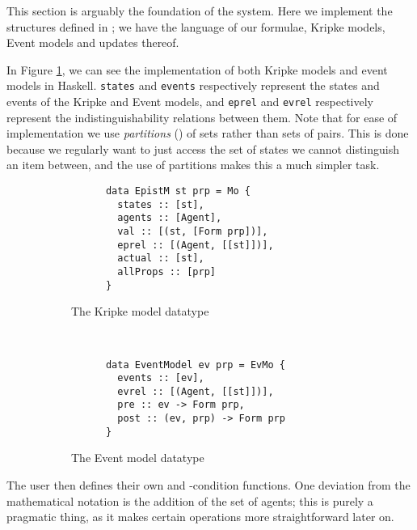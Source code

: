 \documentclass[12pt, a4paper]{article}
\begin{document}
This section is arguably the foundation of the system. Here we implement the
structures defined in ; we have the language of our formulae,
Kripke models, Event models and updates thereof.  

In Figure \ref{fig:HaskellModels}, we can see the implementation of both Kripke
models and event models in Haskell. \texttt{states} and \texttt{events}
respectively represent the states and events of the Kripke and Event models, and
\texttt{eprel} and \texttt{evrel} respectively represent the
indistinguishability relations between them. Note that for ease of
implementation we use \textit{partitions} (\cite{EREL}) of sets rather than sets
of pairs. This is done because we regularly want to just access the set of
states we cannot distinguish an item between, and the use of partitions makes
this a much simpler task. 

\begin{figure}[h]
  \centering
  \begin{subfigure}[b]{0.5\textwidth}
    \begin{verbatim}
      data EpistM st prp = Mo {
        states :: [st],                  
        agents :: [Agent],              
        val :: [(st, [Form prp])],         
        eprel :: [(Agent, [[st]])],
        actual :: [st],              
        allProps :: [prp] 
      }
    \end{verbatim}
    \caption{The Kripke model datatype}
  \end{subfigure}%
~
  \begin{subfigure}[b]{0.5\textwidth}
    \begin{verbatim}
      data EventModel ev prp = EvMo {
        events :: [ev],
        evrel :: [(Agent, [[st]])],
        pre :: ev -> Form prp,
        post :: (ev, prp) -> Form prp
      }
    \end{verbatim}
    \caption{The Event model datatype}
  \end{subfigure}
  \caption{}
  \label{fig:HaskellModels}
\end{figure}

The user then defines their own \tpre and \tpost-condition functions. One
deviation from the mathematical notation is the addition of the set of agents;
this is purely a pragmatic thing, as it makes certain operations more
straightforward later on.
\end{document}

